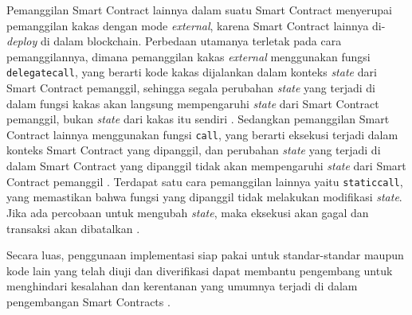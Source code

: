 Pemanggilan Smart Contract lainnya dalam suatu Smart Contract menyerupai pemanggilan kakas dengan mode \textit{external}, karena Smart Contract lainnya di-\textit{deploy} di dalam blockchain. Perbedaan utamanya terletak pada cara pemanggilannya, dimana pemanggilan kakas \textit{external} menggunakan fungsi \texttt{delegatecall}, yang berarti kode kakas dijalankan dalam konteks \textit{state} dari Smart Contract pemanggil, sehingga segala perubahan \textit{state} yang terjadi di dalam fungsi kakas akan langsung mempengaruhi \textit{state} dari Smart Contract pemanggil, bukan \textit{state} dari kakas itu sendiri \parencite{rareskills_delegatecall}. Sedangkan pemanggilan Smart Contract lainnya menggunakan fungsi \texttt{call}, yang berarti eksekusi terjadi dalam konteks Smart Contract yang dipanggil, dan perubahan \textit{state} yang terjadi di dalam Smart Contract yang dipanggil tidak akan mempengaruhi \textit{state} dari Smart Contract pemanggil \parencite{rareskills_lowlevel}. Terdapat satu cara pemanggilan lainnya yaitu \texttt{staticcall}, yang memastikan bahwa fungsi yang dipanggil tidak melakukan modifikasi \textit{state}. Jika ada percobaan untuk mengubah \textit{state}, maka eksekusi akan gagal dan transaksi akan dibatalkan \parencite{rareskills_staticcall}.

Secara luas, penggunaan implementasi siap pakai untuk standar-standar maupun kode lain yang telah diuji dan diverifikasi dapat membantu pengembang untuk menghindari kesalahan dan kerentanan yang umumnya terjadi di dalam pengembangan Smart Contracts \parencite{consensys_duplication_reuse}.
